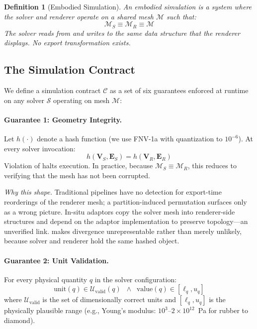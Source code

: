 \documentclass[journal]{IEEEtran}
\newtheorem{definition}{Definition}
\begin{document}
\begin{definition}[Embodied Simulation]
An \emph{embodied simulation} is a system where the solver and renderer
operate on a shared mesh $\mathcal{M}$ such that:
\[
  \mathcal{M}_S \equiv \mathcal{M}_R \equiv \mathcal{M}
\]
The solver reads from and writes to the same data structure that the renderer
displays. No export transformation exists.
\end{definition}


\subsection{The Simulation Contract}
\label{sec:model:contract}

We define a simulation contract $\mathcal{C}$ as a set of six guarantees
enforced at runtime on any solver $\mathcal{S}$ operating on mesh
$\mathcal{M}$:

\paragraph{Guarantee 1: Geometry Integrity.}
Let $h(\cdot)$ denote a hash function (we use FNV-1a with quantization to
$10^{-6}$). At every solver invocation:
\begin{equation}
  h(\mathbf{V}_S, \mathbf{E}_S) = h(\mathbf{V}_R, \mathbf{E}_R)
  \label{eq:geometry}
\end{equation}
Violation of  halts execution. In practice, because
$\mathcal{M}_S \equiv \mathcal{M}_R$, this reduces to verifying that the
mesh has not been corrupted.

\emph{Why this shape.} Traditional pipelines have no detection for
export-time reorderings of the renderer mesh; a partition-induced
permutation surfaces only as a wrong picture. In-situ adaptors copy the
solver mesh into renderer-side structures and depend on the adaptor
implementation to preserve topology---an unverified link.
 makes divergence unrepresentable rather than merely
unlikely, because solver and renderer hold the same hashed object.

\paragraph{Guarantee 2: Unit Validation.}
For every physical quantity $q$ in the solver configuration:
\begin{equation}
  \text{unit}(q) \in \mathcal{U}_{\text{valid}}(q) \;\;\wedge\;\;
  \text{value}(q) \in [\ell_q, u_q]
  \label{eq:units}
\end{equation}
where $\mathcal{U}_{\text{valid}}$ is the set of dimensionally correct units
and $[\ell_q, u_q]$ is the physically plausible range (e.g., Young's modulus:
$10^3$--$2 \times 10^{12}$~Pa for rubber to diamond).
\end{document}
